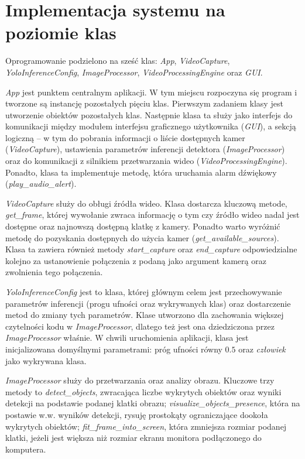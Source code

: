 \section{Implementacja systemu na poziomie klas}
Oprogramowanie podzielono na sześć klas: \emph{App}, \emph{VideoCapture}, \emph{YoloInferenceConfig}, \emph{ImageProcessor}, \emph{VideoProcessingEngine} oraz \emph{GUI}.

\emph{App} jest punktem centralnym aplikacji. W tym miejscu rozpoczyna się program i tworzone są instancję pozostałych pięciu klas. Pierwszym zadaniem klasy jest utworzenie obiektów pozostałych klas. Następnie klasa ta służy jako interfejs do komunikacji między modułem interfejsu graficznego użytkownika (\emph{GUI}), a sekcją logiczną -- w tym do pobrania informacji o liście dostępnych kamer (\emph{VideoCapture}), ustawienia parametrów inferencji detektora (\emph{ImageProcessor}) oraz do komunikacji z silnikiem przetwarzania wideo (\emph{VideoProcessingEngine}).
Ponadto, klasa ta implementuje metodę, która uruchamia alarm dźwiękowy (\emph{{play\_audio\_alert}}). 
 
\emph{VideoCapture} służy do obługi źródła wideo. Klasa dostarcza kluczową metode, \emph{get\_frame}, której wywołanie zwraca informację o tym czy źródło wideo nadal jest dostępne oraz najnowszą dostępną klatkę z kamery. Ponadto warto wyróżnić metodę do pozyskania dostępnych do użycia kamer (\emph{get\_available\_sources}). Klasa ta zawiera również metody \emph{start\_capture} oraz \emph{end\_capture} odpowiedzialne kolejno za ustanowienie połączenia z podaną jako argument kamerą oraz zwolnienia tego połączenia. 

\emph{YoloInferenceConfig} jest to klasa, której głównym celem jest przechowywanie parametrów inferencji (progu ufności oraz wykrywanych klas) oraz dostarczenie metod do zmiany tych parametrów. Klase utworzono dla zachowania większej czytelności kodu w \emph{ImageProcessor}, dlatego też jest ona dziedziczona przez \emph{ImageProcessor} właśnie. W chwili uruchomienia aplikacji, klasa jest inicjalizowana domyślnymi parametrami: próg ufności równy $0.5$ oraz \emph{człowiek} jako wykrywana klasa. 

\emph{ImageProcessor} służy do przetwarzania oraz analizy obrazu. Kluczowe trzy metody to \emph{detect\_objects}, zwracająca liczbe wykrytych obiektów oraz wyniki detekcji na podstawie podanej klatki obrazu; \emph{visualize\_objects\_presence}, która na postawie w.w. wyników detekcji, rysuję prostokąty ograniczające dookoła wykrytych obiektów; \emph{fit\_frame\_into\_screen}, która zmniejsza rozmiar podanej klatki, jeżeli jest większa niż rozmiar ekranu monitora podłączonego do komputera.

